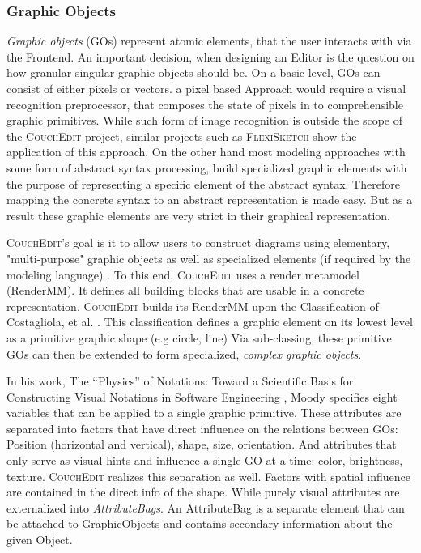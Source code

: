 \subsubsection{Graphic Objects}
\emph{Graphic objects} (GOs) represent atomic elements, that the user interacts with via the Frontend. An important decision, when designing an Editor is the question on how granular singular graphic objects should be. On a basic level, GOs can consist of either pixels or vectors. a pixel based Approach would require a visual recognition preprocessor, that composes the state of pixels in to comprehensible graphic primitives. While such form of image recognition is outside the scope of the \textsc{CouchEdit} project, similar projects such as \textsc{FlexiSketch} \cite{wuest_flexisketch_2015} show the application of this approach. On the other hand most modeling approaches with some form of abstract syntax processing, build specialized graphic elements with the purpose of representing a specific element of the abstract syntax. Therefore mapping the concrete syntax to an abstract representation is made easy. But as a result these graphic elements are very strict in their graphical representation.

\textsc{CouchEdit}'s goal is it to allow users to construct diagrams using elementary, "multi-purpose" graphic objects as well as specialized elements (if required by the modeling language) \cite{nachreiner_couchedit_2020}. To this end, \textsc{CouchEdit} uses a render metamodel (RenderMM). It defines all building blocks that are usable in a concrete representation. \textsc{CouchEdit} builds its RenderMM upon the Classification of Costagliola, et al. \cite{costagliola_classification_2002}. This classification defines a graphic element on its lowest level as a primitive graphic shape (e.g circle, line)  Via sub-classing, these primitive GOs can then be extended to form specialized, \emph{complex graphic objects}.

In his work, The “Physics” of Notations: Toward a Scientific Basis for Constructing Visual Notations in Software Engineering \cite{moody_physics_2009}, Moody specifies eight variables that can be applied to a single graphic primitive. These attributes are separated into factors that have direct influence on the relations between GOs: Position (horizontal and vertical), shape, size, orientation. And attributes that only serve as visual hints and influence a single GO at a time: color, brightness, texture. \textsc{CouchEdit} realizes this separation as well. Factors with spatial influence are contained in the direct info of the shape. While purely visual attributes are externalized into \emph{AttributeBags}. An AttributeBag is a separate element that can be attached to GraphicObjects and contains secondary information about the given Object.

